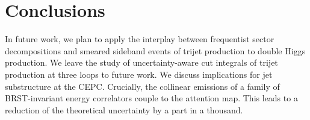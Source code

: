 \section{Conclusions}\label{sec:conclusions}

In future work, we plan to apply the interplay between frequentist
sector decompositions and smeared sideband events of trijet production
to double Higgs production. We leave the study of uncertainty-aware cut
integrals of trijet production at three loops to future work. We discuss
implications for jet substructure at the CEPC. Crucially, the collinear
emissions of a family of BRST-invariant energy correlators couple to the
attention map. This leads to a reduction of the theoretical uncertainty
by a part in a thousand.

